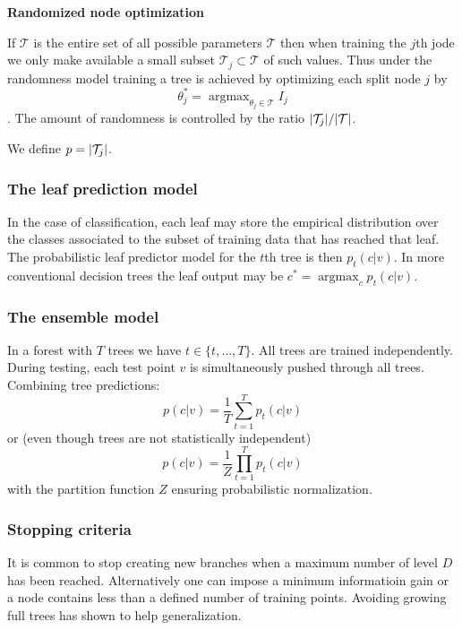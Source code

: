 \documentclass{scrartcl}
\DeclareMathOperator*{\argmax}{argmax} %
\DeclarePairedDelimiter\abs{\lvert}{\rvert}%
\begin{document}
\begin{appendices}
\textbf{Randomized node optimization}
    
If \(\mathcal{T}\) is the entire set of all possible parameters \(\mathcal{T}\) then when training the \(j\)th jode we only make available a small subset \(\mathcal{T}_j \subset \mathcal{T}\) of such values. Thus under the randomness model training a tree is achieved by optimizing each split node \(j\) by
\[\theta_j^* = \argmax_{\theta_j \in \mathcal{T}} I_j\]. The amount of randomness is controlled by the ratio \(\abs{\mathcal{T}_j}/\abs{\mathcal{T}}\).

We define \(p = \abs{\mathcal{T}_j}\).

\subsubsection{The leaf prediction model}
In the case of classification, each leaf may store the empirical distribution over the classes associated to the subset of training data that has reached that leaf. The probabilistic leaf predictor model for the \(t\)th tree is then \(p_t(c|v)\). In more conventional decision trees the leaf output may be \(c^* = \argmax_c p_t(c|v)\).

\subsubsection{The ensemble model}
In a forest with \(T\) trees we have \(t \in \{t, \dots, T\}\). All trees are trained independently. During testing, each test point \(v\) is simultaneously pushed through all trees. Combining tree predictions:
\[p(c|v) = \frac{1}{T} \sum_{t=1}^T p_t (c|v)\]
or (even though trees are not statistically independent)
\[p(c|v) = \frac{1}{Z} \prod_{t=1}^T p_t (c|v)\]
with the partition function \(Z\) ensuring probabilistic normalization.

\subsubsection{Stopping criteria}
It is common to stop creating new branches when a maximum number of level \(D\) has been reached. Alternatively one can impose a minimum informatioin gain or a node contains less than a defined number of training points. Avoiding growing full trees has shown to help generalization.


\end{appendices}
\end{document}

